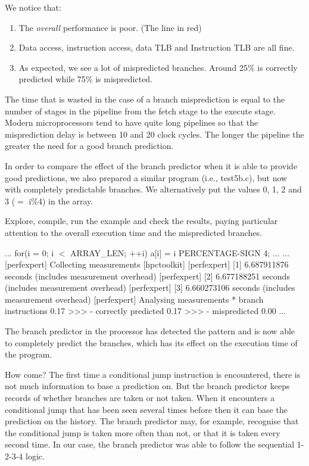 We notice that:

\begin{enumerate}
  \item  The \emph{overall} performance is poor. (The line in red)
  \item  Data access, instruction access, data TLB and Instruction TLB are all fine.
  \item  As expected, we see a lot of mispredicted branches. Around 25\% is correctly predicted while 75\% is mispredicted.
\end{enumerate}

The time that is wasted in the case of a branch misprediction is equal to the number of stages in the pipeline from the fetch stage to the execute stage. Modern microprocessors tend to have quite long pipelines so that the misprediction delay is between 10 and 20 clock cycles. The longer the pipeline the greater the need for a good branch prediction.

In order to compare the effect of the branch predictor when it is able to provide good predictions, we also prepared a similar program (i.e., test5b.c), but now with completely predictable branches. We alternatively put the values 0, 1, 2 and 3 ($=$ i\%4) in the array.

Explore, compile, run the example and check the results, paying particular attention to the overall execution time and the mispredicted branches.

\begin{prompt}
...
 for(i = 0; i $<$ ARRAY\_LEN; ++i)
   a[i] = i PERCENTAGE-SIGN 4;
...
...
[perfexpert] Collecting measurements [hpctoolkit]
[perfexpert]    [1] 6.687911876 seconds (includes measurement overhead)
[perfexpert]    [2] 6.677188251 seconds (includes measurement overhead)
[perfexpert]    [3] 6.660273106 seconds (includes measurement overhead)
[perfexpert] Analysing measurements
* branch instructions   0.17 >>>
 - correctly predicted  0.17 >>>
 - mispredicted         0.00
...
\end{prompt}

The branch predictor in the processor has detected the pattern and is now able to completely predict the branches, which has its effect on the execution time of the program.

How come? The first time a conditional jump instruction is encountered, there is not much information to base a prediction on. But the branch predictor keeps records of whether branches are taken or not taken. When it encounters a conditional jump that has been seen several times before then it can base the prediction on the history. The branch predictor may, for example, recognise that the conditional jump is taken more often than not, or that it is taken every second time. In our case, the branch predictor was able to follow the sequential 1-2-3-4 logic.

